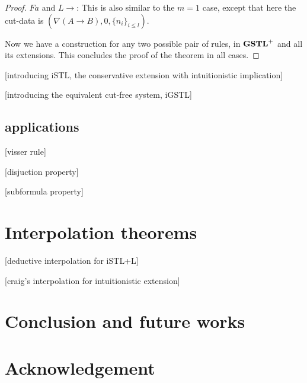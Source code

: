 \documentclass[12pt,a4paper]{article}
\begin{document}
\begin{proof}
 $Fa$ and $L \rightarrow$: This is also similar to the $m = 1$ case, except that here the cut-data is $(\nabla (A \rightarrow B), 0, \{n_i\}_{i \leq l})$.
 \vspace{5mm}

 Now we have a construction for any two possible pair of rules, in $\mathbf{GSTL}^+$ and all its extensions. This concludes the proof of the theorem in all cases.

\end{proof}

[introducing iSTL, the conservative extension with intuitionistic implication]

[introducing the equivalent cut-free system, iGSTL]

\subsection{applications}
[visser rule]

[disjuction property]

[subformula property]

\section{Interpolation theorems}
[deductive interpolation for iSTL+L]

[craig's interpolation for intuitionistic extension]

\section{Conclusion and future works}

\section{Acknowledgement}



\end{document}
